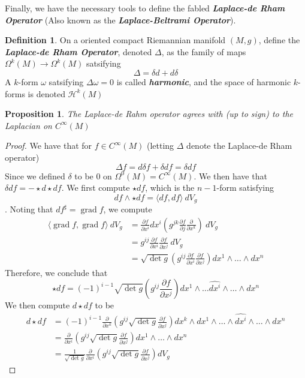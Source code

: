\documentclass[psamsfonts]{amsart}
\newtheorem{prop}[thm]{Proposition}
\theoremstyle{definition}
\newtheorem{defn}[thm]{Definition}
\theoremstyle{remark}
\newcommand{\ib}[1]{\textbf{\textit{#1}}}
\DeclareMathOperator{\grad}{grad}
\begin{document}
Finally,  we have the necessary tools to define the fabled \ib{Laplace-de Rham Operator} (Also known as the  \ib{Laplace-Beltrami Operator}).
\begin{defn}
On a oriented compact Riemannian manifold $(M,g)$, define the \ib{Laplace-de Rham Operator}, denoted $\Delta$, as  the family of maps $\Omega^k(M) \to \Omega^k(M)$ satsifying
$$\Delta = \delta d + d\delta $$
A $k$-form $\omega$ satsifying $\Delta\omega = 0$ is called \ib{harmonic}, and the space of harmonic $k$-forms is denoted $\mathcal{H}^k(M)$
\end{defn}

\begin{prop}
The Laplace-de Rahm operator agrees with (up to sign) to the Laplacian on $C^\infty(M)$
\end{prop}
%
\begin{proof}
We have that for $f \in C^\infty(M)$ (letting $\Delta$ denote the Laplace-de Rham operator)
$$\Delta f  = d\delta f + \delta d f = \delta df$$
Since we defined $\delta$ to be $0$ on $\Omega^0(M) = C^\infty(M)$.
We then have that $\delta df = -\star d\star df$. We first compute $\star df$, which is the $n-1$-form satisfying 
$$df \wedge \star df = \langle df, df \rangle ~dV_g $$. Noting that $df^\sharp = \grad f$, we compute
\begin{align*}
\langle \grad f, \grad f\rangle ~dV_g &= \frac{\partial f}{\partial x^i} dx^i \left( g^{jk}\frac{\partial f}{\partial j}\frac{\partial}{\partial x^k} \right)~dV_g \\
&= g^{ij}\frac{\partial  f}{\partial x^i}\frac{\partial f}{\partial x^j} ~dV_g \\
&= \sqrt{\det g}\left( g^{ij}\frac{\partial  f}{\partial x^i}\frac{\partial f}{\partial x^j} \right)dx^1\wedge \ldots \wedge dx^n
\end{align*}
Therefore, we conclude that
$$\star df = (-1)^{i-1}\sqrt{\det g} \left(g^{ij}\frac{\partial f}{\partial x^j} \right)dx^1 \wedge \ldots \hat{dx^i} \wedge \ldots \wedge dx^n $$
We then compute $d\star df$ to be 
\begin{align*}
d\star df &= (-1)^{i-1} \frac{\partial}{\partial x^k}\left( g^{ij}\sqrt{\det g}\frac{\partial f}{\partial x^j} \right) dx^k \wedge dx^1 \wedge \ldots \wedge \hat{dx^i} \wedge \ldots \wedge dx^n \\
&= \frac{\partial}{\partial x^i}\left( g^{ij}\sqrt{\det g}\frac{\partial f}{\partial x^j} \right) dx^1 \wedge \ldots \wedge dx^n \\
&= \frac{1}{\sqrt{\det g}} \frac{\partial}{\partial x^i}\left( g^{ij}\sqrt{\det g}\frac{\partial f}{\partial x^j} \right) dV_g
\end{align*}


\end{proof}
\end{document}
